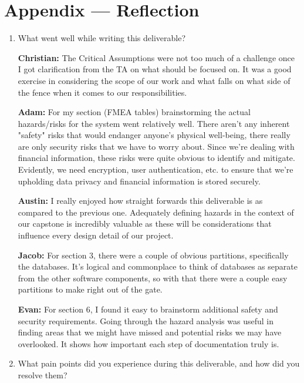 \documentclass{article}
\begin{document}
\newpage{}

\section*{Appendix --- Reflection}




\begin{enumerate}
    \item What went well while writing this deliverable? 

    \textbf{Christian:} The Critical Assumptions were not too much of a challenge once I got clarification from the TA on what should be focused on. It was a good exercise in considering the scope of our work and what falls on what side of the fence when it comes to our responsibilities.

    \textbf{Adam:} For my section (FMEA tables) brainstorming the actual hazards/risks for the system went relatively well. There aren't any inherent "safety" risks that would endanger anyone's physical well-being, there really are only security risks that we have to worry about. Since we're dealing with financial information, these risks were quite obvious to identify and mitigate. Evidently, we need encryption, user authentication, etc. to ensure that we're upholding data privacy and financial information is stored securely.

    \textbf{Austin:} I really enjoyed how straight forwards this deliverable is as compared to the previous one. Adequately defining hazards in the context of our capstone is incredibly valuable as these will be considerations that influence every design detail of our project.
    
    \textbf{Jacob:} For section 3, there were a couple of obvious partitions, specifically the databases. It's logical and commonplace to think of databases as separate from the other software components, so with that there were a couple easy partitions to make right out of the gate.

    \textbf{Evan:} For section 6, I found it easy to brainstorm additional safety and security requirements. Going through the hazard analysis was useful in finding areas that we might have missed and potential risks we may have overlooked. It shows how important each step of documentation truly is.
    
    \item What pain points did you experience during this deliverable, and how
    did you resolve them?


\end{enumerate}
\end{document}
